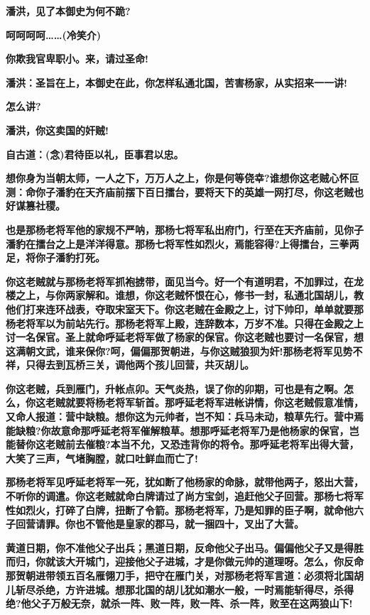 \textbf{潘洪，见了本御史为何不跪?}

\textbf{呵呵呵呵\ldots{}\ldots{}(冷笑介)}

\textbf{你欺我官卑职小。来，请过圣命!}

\textbf{潘洪：圣旨在上，本御史在此，你怎样私通北国，苦害杨家，从实招来一一讲!}

\textbf{怎么讲?}

\textbf{潘洪，你这卖国的奸贼!}

\textbf{自古道：(念)君待臣以礼，臣事君以忠。}

\textbf{想你身为当朝太师，一人之下，万万人之上，你是何等侥幸?谁想你这老贼心怀叵测：命你子潘豹在天齐庙前摆下百日擂台，要将天下的英雄一网打尽，你这老贼也好谋篡社稷。}

\textbf{也是那杨老将军他的家规不严呐，那杨七将军私出府门，行至在天齐庙前，见你子潘豹在擂台之上是洋洋得意。那杨七将军性如烈火，焉能容得?上得擂台，三拳两足，将你子潘豹打死。}

\textbf{你这老贼就与那杨老将军抓袍掳带，面见当今。好一个有道明君，不加罪过，在龙楼之上，与你两家解和。谁想，你这老贼怀恨在心，修书一封，私通北国胡儿，教他们打来连环战表，夺取宋室天下。你这老贼在金殿之上，讨下帅印，单单就要那杨老将军以为前站先行。那杨老将军上殿，连辞数本，万岁不准。只得在金殿之上讨一名保官。圣上就命呼延老将军做了杨家的保官。你这老贼也要讨一名保官，想这满朝文武，谁来保你?呵，偏偏那贺朝进，与你这贼狼狈为奸!那杨老将军见势不祥，只得去到瓦桥三关，调他两个孩儿回营，共灭胡儿。}

\textbf{你这老贼，兵到雁门，升帐点卯。天气炎热，误了你的卯期，可也是有之啊。怎么，你这老贼就要将杨老将军斩首。那呼延老将军进帐讲情，你这老贼假意准情，又命人报道：营中缺粮。想你这为元帅者，岂不知：兵马未动，粮草先行。营中焉能缺粮?你故意命那呼延老将军催解粮草。想那呼延老将军乃是他杨家的保官，岂能替你这老贼前去催粮?本当不允，又恐违背你的将令。那呼延老将军出得大营，大笑了三声，气堵胸膛，就口吐鲜血而亡了!}

\textbf{那杨老将军见呼延老将军一死，犹如断了他杨家的命脉，就带他两子，怒出大营，不听你的调遣。你这老贼就命白牌请过了尚方宝剑，追赶他父子回营。那杨七将军性如烈火，打碎了白牌，扭断了令箭。那杨老将军，乃是知罪的臣子啊，就命他六子回营请罪。你也不管他是皇家的郡马，就一捆四十，叉出了大营。}

\textbf{黄道日期，你不准他父子出兵；黑道日期，反命他父子出马。偏偏他父子又是得胜而归，你就该大开城门，迎接他父子进城，才是你做元帅的道理呀。怎么，你反命那贺朝进带领五百名雁翎刀手，把守在雁门关，对那杨老将军言道：必须将北国胡儿斩尽杀绝，方许进城。想那北国的胡儿犹如潮水一般，一时焉能斩得尽，杀得绝?他父子万般无奈，就杀一阵、败一阵，败一阵、杀一阵，败至在这两狼山下!}

